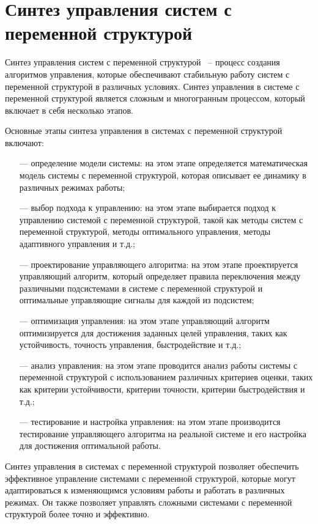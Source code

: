 \section{Синтез управления систем с переменной структурой} 

  Синтез управления систем с переменной структурой~\cite{4412471} -- процесс создания алгоритмов управления, которые обеспечивают стабильную работу систем с переменной структурой в различных условиях. Синтез управления в системе с переменной структурой является сложным и многогранным процессом, который включает в себя несколько этапов.

Основные этапы синтеза управления в системах с переменной структурой включают:
\begin{enumerate}
\item[—] определение модели системы: на этом этапе определяется математическая модель системы с переменной структурой, которая описывает ее динамику в различных режимах работы;
\item[—] выбор подхода к управлению: на этом этапе выбирается подход к управлению системой с переменной структурой, такой как методы систем с переменной структурой, методы оптимального управления, методы адаптивного управления и т.д.;
\item[—] проектирование управляющего алгоритма: на этом этапе проектируется управляющий алгоритм, который определяет правила переключения между различными подсистемами в системе с переменной структурой и оптимальные управляющие сигналы для каждой из подсистем;
\item[—] оптимизация управления: на этом этапе управляющий алгоритм оптимизируется для достижения заданных целей управления, таких как устойчивость, точность управления, быстродействие и т.д.;
\item[—] анализ управления: на этом этапе проводится анализ работы системы с переменной структурой с использованием различных критериев оценки, таких как критерии устойчивости, критерии точности, критерии быстродействия и т.д.;
\item[—] тестирование и настройка управления: на этом этапе производится тестирование управляющего алгоритма на реальной системе и его настройка для достижения оптимальной работы.
\end{enumerate}

Синтез управления в системах с переменной структурой позволяет обеспечить эффективное управление системами с переменной структурой, которые могут адаптироваться к изменяющимся условиям работы и работать в различных режимах. Он также позволяет управлять сложными системами с переменной структурой более точно и эффективно.

